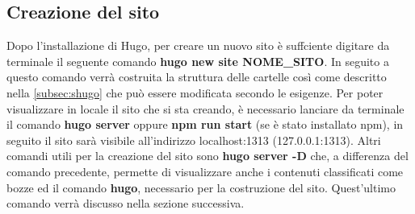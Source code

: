 \documentclass[target=bach,aauheader=]{thud}
\begin{document}
\subsection{Creazione del sito}\label{sec:creazione}
Dopo l'installazione di Hugo, per creare un nuovo sito è suffciente digitare da terminale il seguente comando \textbf{hugo new site NOME\_SITO}. 
In seguito a questo comando verrà costruita la struttura delle cartelle così come descritto nella \cref{subsec:shugo} che può essere modificata secondo le esigenze.
\newline
Per poter visualizzare in locale il sito che si sta creando, è necessario lanciare da terminale il comando \textbf{hugo server} oppure \textbf{npm run start} (se è stato installato npm), in seguito il sito sarà visibile all'indirizzo localhost:1313 (127.0.0.1:1313).
\newline
Altri comandi utili per la creazione del sito sono \textbf{hugo server -D} che, a differenza del comando precedente, permette di visualizzare anche i contenuti classificati come bozze ed il comando \textbf{hugo}, necessario per la costruzione del sito. Quest'ultimo comando verrà discusso nella sezione successiva.

\end{document}
